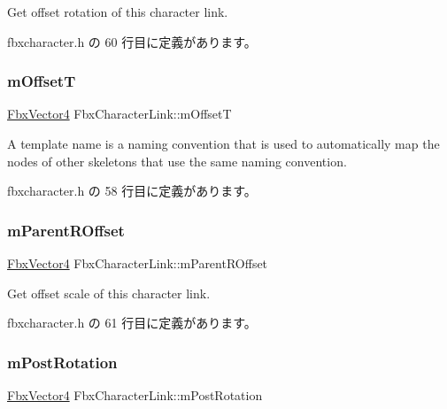 Get offset rotation of this character link. 



 fbxcharacter.\+h の 60 行目に定義があります。

\mbox{\label{class_fbx_character_link_a3baf29ae4a06587d77e8a8ac9fef225d}} 
\subsubsection{\texorpdfstring{m\+OffsetT}{mOffsetT}}
{\footnotesize\ttfamily \hyperlink{class_fbx_vector4}{Fbx\+Vector4} Fbx\+Character\+Link\+::m\+OffsetT}



A template name is a naming convention that is used to automatically map the nodes of other skeletons that use the same naming convention. 



 fbxcharacter.\+h の 58 行目に定義があります。

\mbox{\label{class_fbx_character_link_a82c5bd03f0927e100bd8ee6315cd5db0}} 
\subsubsection{\texorpdfstring{m\+Parent\+R\+Offset}{mParentROffset}}
{\footnotesize\ttfamily \hyperlink{class_fbx_vector4}{Fbx\+Vector4} Fbx\+Character\+Link\+::m\+Parent\+R\+Offset}



Get offset scale of this character link. 



 fbxcharacter.\+h の 61 行目に定義があります。

\mbox{\label{class_fbx_character_link_a35c2a40e3cbf60ed88c23487c3c57526}} 
\subsubsection{\texorpdfstring{m\+Post\+Rotation}{mPostRotation}}
{\footnotesize\ttfamily \hyperlink{class_fbx_vector4}{Fbx\+Vector4} Fbx\+Character\+Link\+::m\+Post\+Rotation}



